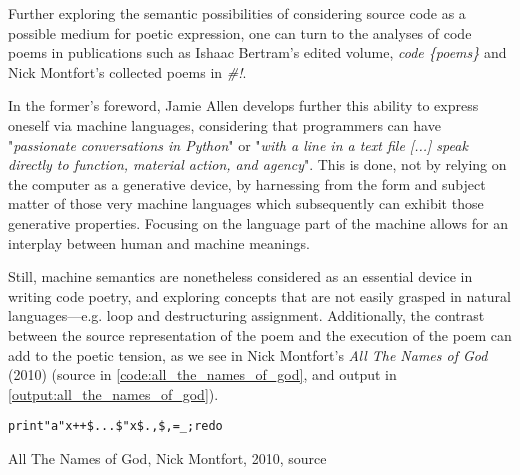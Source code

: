 Further exploring the semantic possibilities of considering source code as a possible medium for poetic expression, one can turn to the analyses of code poems in publications such as Ishaac Bertram's edited volume, \emph{code \{poems\}} and Nick Montfort's collected poems in \emph{\#!}.

In the former's foreword, Jamie Allen develops further this ability to express oneself via machine languages, considering that programmers can have "\emph{passionate conversations in Python}" or "\emph{with a line in a text file [...] speak directly to function, material action, and agency}"\cite{bertram_code_2012}. This is done, not by relying on the computer as a generative device, by harnessing from the form and subject matter of those very machine languages which subsequently can exhibit those generative properties. Focusing on the language part of the machine allows for an interplay between human and machine meanings.

Still, machine semantics are nonetheless considered as an essential device in writing code poetry, and exploring concepts that are not easily grasped in natural languages—e.g. loop and destructuring assignment. Additionally, the contrast between the source representation of the poem and the execution of the poem can add to the poetic tension, as we see in Nick Montfort's \emph{All The Names of God} (2010) (source in \ref{code:all_the_names_of_god}, and output in \ref{output:all_the_names_of_god}).

\begin{listing}
  \begin{verbatim}
print"a"x++$...$"x$.,$,=_;redo
\end{verbatim}
  \caption{All The Names of God, Nick Montfort, 2010, source}
  \label{code:all_the_names_of_god}
\end{listing}

